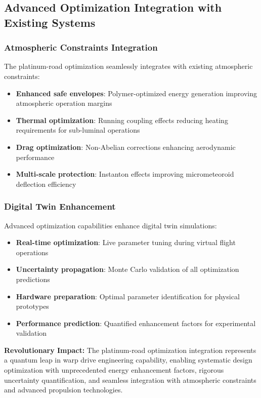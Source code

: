 \documentclass[11pt]{article}
\begin{document}
\subsection{Advanced Optimization Integration with Existing Systems}

\subsubsection{Atmospheric Constraints Integration}
The platinum-road optimization seamlessly integrates with existing atmospheric constraints:
\begin{itemize}
    \item \textbf{Enhanced safe envelopes}: Polymer-optimized energy generation improving atmospheric operation margins
    \item \textbf{Thermal optimization}: Running coupling effects reducing heating requirements for sub-luminal operations
    \item \textbf{Drag optimization}: Non-Abelian corrections enhancing aerodynamic performance
    \item \textbf{Multi-scale protection}: Instanton effects improving micrometeoroid deflection efficiency
\end{itemize}

\subsubsection{Digital Twin Enhancement}
Advanced optimization capabilities enhance digital twin simulations:
\begin{itemize}
    \item \textbf{Real-time optimization}: Live parameter tuning during virtual flight operations
    \item \textbf{Uncertainty propagation}: Monte Carlo validation of all optimization predictions
    \item \textbf{Hardware preparation}: Optimal parameter identification for physical prototypes
    \item \textbf{Performance prediction}: Quantified enhancement factors for experimental validation
\end{itemize}

\textbf{Revolutionary Impact:} The platinum-road optimization integration represents a quantum leap in warp drive engineering capability, enabling systematic design optimization with unprecedented energy enhancement factors, rigorous uncertainty quantification, and seamless integration with atmospheric constraints and advanced propulsion technologies.
\end{document}

